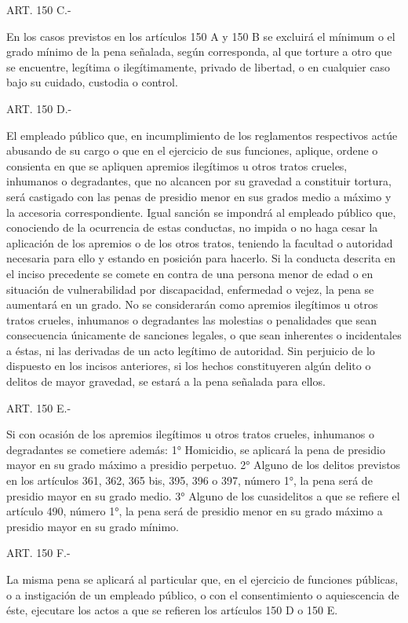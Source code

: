     ART. 150 C.-

    En los casos previstos en los artículos 150 A y 150 B se excluirá el mínimum o el grado mínimo de la pena señalada, según corresponda, al que torture a otro que se encuentre, legítima o ilegítimamente, privado de libertad, o en cualquier caso bajo su cuidado, custodia o control.

    ART. 150 D.-

    El empleado público que, en incumplimiento de los reglamentos respectivos actúe abusando de su cargo o que en el ejercicio de sus funciones, aplique, ordene o consienta en que se apliquen apremios ilegítimos u otros tratos crueles, inhumanos o degradantes, que no alcancen por su gravedad a constituir tortura, será castigado con las penas de presidio menor en sus grados medio a máximo y la accesoria correspondiente. Igual sanción se impondrá al empleado público que, conociendo de la ocurrencia de estas conductas, no impida o no haga cesar la aplicación de los apremios o de los otros tratos, teniendo la facultad o autoridad necesaria para ello y estando en posición para hacerlo.
    Si la conducta descrita en el inciso precedente se comete en contra de una persona menor de edad o en situación de vulnerabilidad por discapacidad, enfermedad o vejez, la pena se aumentará en un grado.
    No se considerarán como apremios ilegítimos u otros tratos crueles, inhumanos o degradantes las molestias o penalidades que sean consecuencia únicamente de sanciones legales, o que sean inherentes o incidentales a éstas, ni las derivadas de un acto legítimo de autoridad.
    Sin perjuicio de lo dispuesto en los incisos anteriores, si los hechos constituyeren algún delito o delitos de mayor gravedad, se estará a la pena señalada para ellos.


    ART. 150 E.-

    Si con ocasión de los apremios ilegítimos u otros tratos crueles, inhumanos o degradantes se cometiere además:
    1° Homicidio, se aplicará la pena de presidio mayor en su grado máximo a presidio perpetuo.
    2° Alguno de los delitos previstos en los artículos 361, 362, 365 bis, 395, 396 o 397, número 1°, la pena será de presidio mayor en su grado medio.
    3° Alguno de los cuasidelitos a que se refiere el artículo 490, número 1°, la pena será de presidio menor en su grado máximo a presidio mayor en su grado mínimo.

    ART. 150 F.-

    La misma pena se aplicará al particular que, en el ejercicio de funciones públicas, o a instigación de un empleado público, o con el consentimiento o aquiescencia de éste, ejecutare los actos a que se refieren los artículos 150 D o 150 E.

